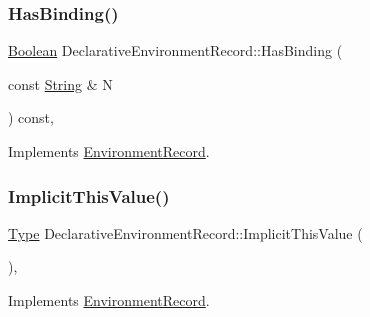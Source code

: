\subsubsection{\texorpdfstring{Has\+Binding()}{HasBinding()}\hspace{0.1cm}{\footnotesize\ttfamily [2/2]}}
{\footnotesize\ttfamily \hyperlink{struct_boolean}{Boolean} Declarative\+Environment\+Record\+::\+Has\+Binding (\begin{DoxyParamCaption}\item[{const \hyperlink{struct_string}{String} \&}]{N }\end{DoxyParamCaption}) const\hspace{0.3cm}{\ttfamily [final]}, {\ttfamily [virtual]}}



Implements \hyperlink{struct_environment_record_a4e9bc2438be3466fd0d9607cdbd20225}{Environment\+Record}.

\mbox{\label{struct_declarative_environment_record_a0e5b27bb35773d4dbf994384265de1c8}} 
\subsubsection{\texorpdfstring{Implicit\+This\+Value()}{ImplicitThisValue()}\hspace{0.1cm}{\footnotesize\ttfamily [1/2]}}
{\footnotesize\ttfamily \hyperlink{class_type}{Type} Declarative\+Environment\+Record\+::\+Implicit\+This\+Value (\begin{DoxyParamCaption}{ }\end{DoxyParamCaption})\hspace{0.3cm}{\ttfamily [final]}, {\ttfamily [virtual]}}



Implements \hyperlink{struct_environment_record_acef5c0dac3d58cbef25daa495c5d0e00}{Environment\+Record}.

\mbox{\label{struct_declarative_environment_record_aafb5da7123366dd48562e07fd393af2d}} 
